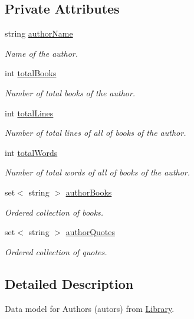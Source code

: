 \subsection*{Private Attributes}
\begin{DoxyCompactItemize}
\item 
string \hyperlink{class_author_a146b76b89d701097c36fb5d29df27bc4}{author\-Name}
\begin{DoxyCompactList}\small\item\em Name of the author. \end{DoxyCompactList}\item 
int \hyperlink{class_author_ac870b8c861aa0f69cd2c4e7b8d414902}{total\-Books}
\begin{DoxyCompactList}\small\item\em Number of total books of the author. \end{DoxyCompactList}\item 
int \hyperlink{class_author_a8d818414bbd909287641b388601bf61a}{total\-Lines}
\begin{DoxyCompactList}\small\item\em Number of total lines of all of books of the author. \end{DoxyCompactList}\item 
int \hyperlink{class_author_a478c72fff965eb1ee8fcaddfe173715b}{total\-Words}
\begin{DoxyCompactList}\small\item\em Number of total words of all of books of the author. \end{DoxyCompactList}\item 
set$<$ string $>$ \hyperlink{class_author_ad9ffe450cdafed2242936f6fcafa22b4}{author\-Books}
\begin{DoxyCompactList}\small\item\em Ordered collection of books. \end{DoxyCompactList}\item 
set$<$ string $>$ \hyperlink{class_author_ad505d991f439d28c4831828952e01fb6}{author\-Quotes}
\begin{DoxyCompactList}\small\item\em Ordered collection of quotes. \end{DoxyCompactList}\end{DoxyCompactItemize}


\subsection{Detailed Description}
Data model for Authors (autors) from \hyperlink{class_library}{Library}. 

